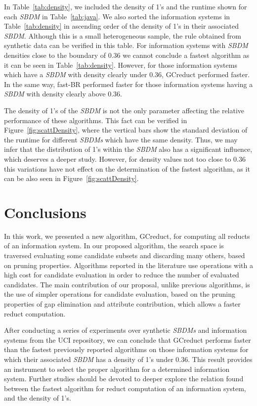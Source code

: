 \documentclass[number,preprint,review,12pt]{elsarticle}
\begin{document}
	\label{par:kind}
	In Table~\ref{tab:density}, we included the density of 1's and the runtime shown for each \textit{SBDM} in Table~\ref{tab:java}. We also sorted the information systems in Table~\ref{tab:density} in ascending order of the density of 1's in their associated \textit{SBDM}. Although this is a small heterogeneous sample, the rule obtained from synthetic data can be verified in this table. For information systems with \textit{SBDM} densities close to the boundary of 0.36 we cannot conclude a fastest algorithm as it can be seen in Table~\ref{tab:density}. However, for those information systems which have a \textit{SBDM} with density clearly under 0.36, GCreduct performed faster. In the same way, fast-BR performed faster for those information systems having a \textit{SBDM} with density clearly above 0.36.
	
	The density of 1's of the \textit{SBDM} is not the only parameter affecting the relative performance of these algorithms. This fact can be verified in Figure~\ref{fig:scattDensity}, where the vertical bars show the standard deviation of the runtime for different \textit{SBDMs} which have the same density. Thus, we may infer that the distribution of 1's within the \textit{SBDM} also has a significant influence, which deserves a deeper study. However, for density values not too close to 0.36 this variations have not effect on the determination of the fastest algorithm, as it can be also seen in Figure~\ref{fig:scattDensity}.\label{par:distribution}

\section{Conclusions}\label{conclusions}
	In this work, we presented a new algorithm, GCreduct, for computing all reducts of an information system. In our proposed algorithm, the search space is traversed evaluating some candidate subsets and discarding many others, based on pruning properties. Algorithms reported in the literature use operations with a high cost for candidate evaluation in order to reduce the number of evaluated candidates. The main contribution of our proposal, unlike previous algorithms, is the use of simpler operations for candidate evaluation, based on the pruning properties of gap elimination and attribute contribution, which allows a faster reduct computation. 
	
	After conducting a series of experiments over synthetic \textit{SBDMs} and information systems from the UCI repository, we can conclude that GCreduct performs faster than the fastest previously reported algorithms on those information systems for which their associated \textit{SBDM} has a density of 1's under 0.36. This result provides an instrument to select the proper algorithm for a determined information system. Further studies should be devoted to deeper explore the relation found between the fastest algorithm for reduct computation of an information system, and the density of 1's. 
	
\end{document}
